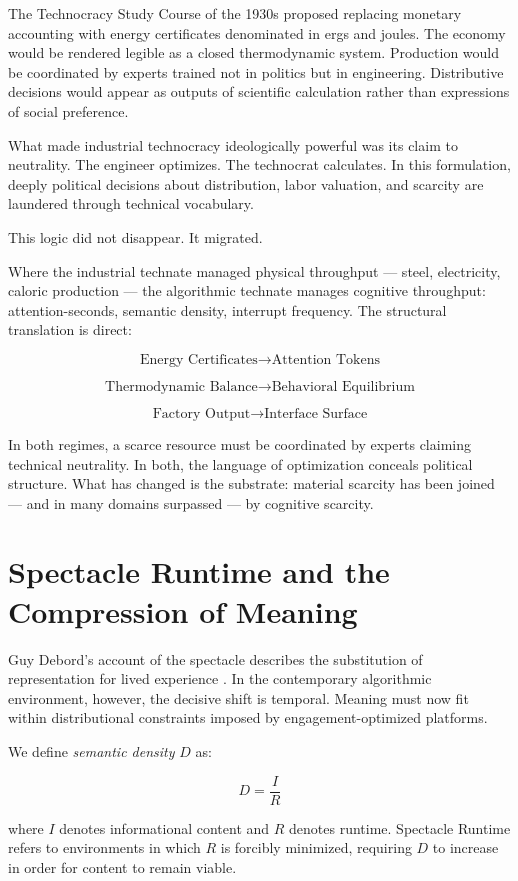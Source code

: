 \documentclass[12pt]{article}
\begin{document}
The Technocracy Study Course of the 1930s proposed replacing monetary accounting with energy certificates denominated in ergs and joules. The economy would be rendered legible as a closed thermodynamic system. Production would be coordinated by experts trained not in politics but in engineering. Distributive decisions would appear as outputs of scientific calculation rather than expressions of social preference.

What made industrial technocracy ideologically powerful was its claim to neutrality. The engineer optimizes. The technocrat calculates. In this formulation, deeply political decisions about distribution, labor valuation, and scarcity are laundered through technical vocabulary.

This logic did not disappear. It migrated.

Where the industrial technate managed physical throughput — steel, electricity, caloric production — the algorithmic technate manages cognitive throughput: attention-seconds, semantic density, interrupt frequency. The structural translation is direct:

\[
\text{Energy Certificates} \rightarrow \text{Attention Tokens}
\]

\[
\text{Thermodynamic Balance} \rightarrow \text{Behavioral Equilibrium}
\]

\[
\text{Factory Output} \rightarrow \text{Interface Surface}
\]

In both regimes, a scarce resource must be coordinated by experts claiming technical neutrality. In both, the language of optimization conceals political structure. What has changed is the substrate: material scarcity has been joined — and in many domains surpassed — by cognitive scarcity.

\section{Spectacle Runtime and the Compression of Meaning}

Guy Debord's account of the spectacle describes the substitution of representation for lived experience \cite{Debord1994}. In the contemporary algorithmic environment, however, the decisive shift is temporal. Meaning must now fit within distributional constraints imposed by engagement-optimized platforms.

We define \emph{semantic density} $D$ as:

\[
D = \frac{I}{R}
\]

where $I$ denotes informational content and $R$ denotes runtime. Spectacle Runtime refers to environments in which $R$ is forcibly minimized, requiring $D$ to increase in order for content to remain viable.
\end{document}

